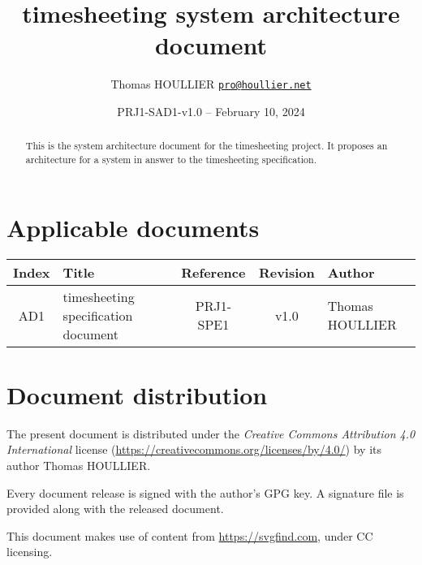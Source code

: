 \documentclass[letterpaper]{article}
\title{timesheeting system architecture document}
\author{Thomas HOULLIER \href{mailto:pro@houllier.net}
         {\texttt{\textlangle pro@houllier.net\textrangle}}}
\begin{document}
\frenchspacing
\date{PRJ1-SAD1-v1.0 -- February 10, 2024}
\maketitle
\thispagestyle{FirstPage}

\begin{abstract}
  This is the system architecture document for the timesheeting project.
  It proposes an architecture for a system in answer to the timesheeting
  specification.
\end{abstract}

\begin{versionhistory}
\end{versionhistory}
\setcounter{table}{0} %

\section*{Applicable documents}
{ \centering
\begin{tabularx}{\textwidth}{| c | X | c | c | X |} \hline
  Index & Title & Reference & Revision & Author \\ \hline
  AD1   & timesheeting specification document & PRJ1-SPE1 & v1.0 & Thomas HOULLIER \\
  \hline \end{tabularx} \par }

\section*{Document distribution}
The present document is distributed under the \emph{Creative Commons Attribution
4.0 International} license (\url{https://creativecommons.org/licenses/by/4.0/})
by its author Thomas HOULLIER.

Every document release is signed with the author's GPG key. A signature file
is provided along with the released document.

This document makes use of content from \url{https://svgfind.com}, under
CC licensing.

\tableofcontents
\printglossary[type=\acronymtype,style=index]
\pagestyle{plain}





\appendix


\apptocmd{\thebibliography}{\raggedright}{}{}
\begingroup
{}
\setlength\bibitemsep{0pt}
\printbibliography
\endgroup
\end{document}
